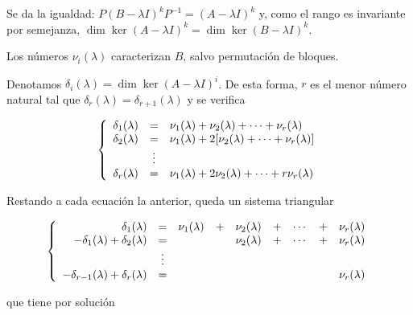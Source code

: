 \documentclass[../ecuaciones_diferenciales.tex]{subfiles}
\begin{document}
\begin{remark}
	Se da la igualdad: \(P{(B - \lambda I)}^k P^{-1} = {(A - \lambda I)}^k\) y, como el rango es
	invariante por semejanza, \(\dim \ker {(A - \lambda I)}^k = \dim \ker{(B -
	\lambda I)}^k\).
\end{remark}

\begin{remark}
	Los números \(\nu_i(\lambda)\) caracterizan \(B\), salvo permutación de bloques.
\end{remark}

Denotamos \(\delta_i(\lambda) = \dim \ker {(A - \lambda I)}^i\). De esta forma,
\(r\) es el menor número natural tal que \(\delta_r(\lambda) =
\delta_{r+1}(\lambda)\) y se verifica

\[\left\{
	\begin{array}[ht]{r c l}
		\delta_1(\lambda) & =      & \nu_1(\lambda) + \nu_2(\lambda) + \cdots +
		\nu_r(\lambda)                                                                           \\
		\delta_2(\lambda) & =      & \nu_1(\lambda) + 2[\nu_2(\lambda) + \cdots +
		\nu_r(\lambda)]                                                                          \\
		                  & \vdots &                                                             \\
		\delta_r(\lambda) & =      & \nu_1(\lambda) + 2\nu_2(\lambda) + \cdots + r\nu_r(\lambda)
	\end{array}
	\right.
\]

Restando a cada ecuación la anterior, queda un sistema triangular

\[\left\{
	\begin{array}[ht]{r c c c c c c c c}
		\delta_1(\lambda)                          & =      & \nu_1(\lambda) & + & \nu_2(\lambda) & + & \cdots & + & \nu_r(\lambda) \\
		-\delta_1(\lambda) + \delta_2(\lambda)     & =      &                &   & \nu_2(\lambda) & + & \cdots & + & \nu_r(\lambda) \\
		                                           & \vdots &                                                                       \\
		-\delta_{r-1}(\lambda) + \delta_r(\lambda) & =      &                &   &                &   &        &   & \nu_r(\lambda)
	\end{array}
	\right.
\]

que tiene por solución
\end{document}
